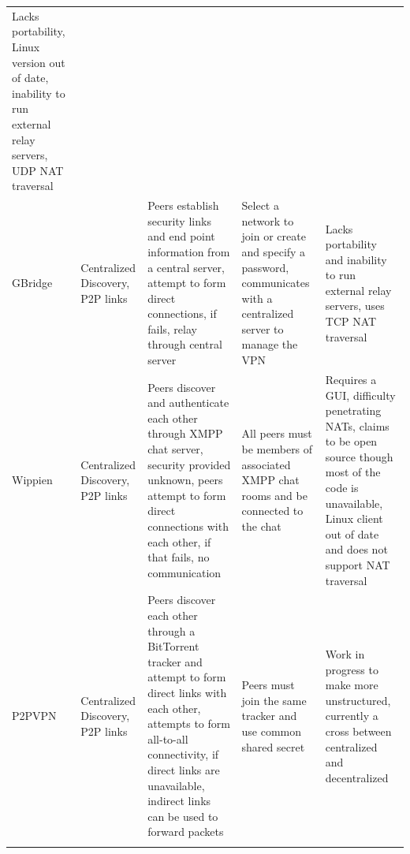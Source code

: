 \begin{center}
{{\begin{longtable}{p{.8in}p{1.15in}p{1.3in}p{1.25in}p{1.25in}}
Lacks portability, Linux version out of date, inability to run external relay
servers, UDP NAT traversal
\\
GBridge
&
Centralized Discovery, P2P links
&
Peers establish security links and end point information from a central
server, attempt to form direct connections, if fails, relay through central
server
&
Select a network to join or create and specify a password, communicates with a
centralized server to manage the VPN
&
Lacks portability and inability to run external relay servers, uses TCP NAT
traversal
\\
Wippien
&
Centralized Discovery, P2P links
&
Peers discover and authenticate each other through XMPP chat server, security
provided unknown, peers attempt to form direct connections with each other, if
that fails, no communication
&
All peers must be members of associated XMPP chat rooms and be connected to the
chat
&
Requires a GUI, difficulty penetrating NATs, claims to be open source though
most of the code is unavailable, Linux client out of date and does not support
NAT traversal
\\
P2PVPN
&
Centralized Discovery, P2P links
&
Peers discover each other through a BitTorrent tracker and attempt to form
direct links with each other, attempts to form all-to-all connectivity, if
direct links are unavailable, indirect links can be used to forward packets
&
Peers must join the same tracker and use common shared secret
&
Work in progress to make more unstructured, currently a cross between
centralized and decentralized
\\ \hline
\label{tab:virtual_networks}
\end{longtable} } }
\end{center}
